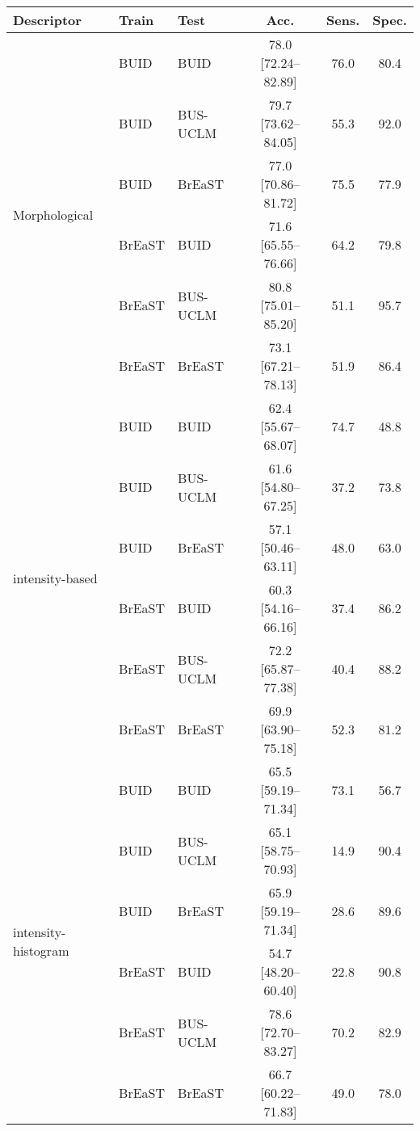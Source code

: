 \begin{tabular}{lllccc}\\ 
\toprule
Descriptor & Train &Test & Acc. & Sens. &Spec.\\ 
\midrule
\multirow{6}{*}{Morphological} & BUID & BUID & 78.0 [72.24--82.89] & 76.0 & 80.4\\ 
 & BUID & BUS-UCLM & 79.7 [73.62--84.05] & 55.3 & 92.0\\ 
 & BUID & BrEaST & 77.0 [70.86--81.72] & 75.5 & 77.9\\ 
 & BrEaST & BUID & 71.6 [65.55--76.66] & 64.2 & 79.8\\ 
 & BrEaST & BUS-UCLM & 80.8 [75.01--85.20] & 51.1 & 95.7\\ 
 & BrEaST & BrEaST & 73.1 [67.21--78.13] & 51.9 & 86.4\\ 
\midrule
\multirow{6}{*}{intensity-based} & BUID & BUID & 62.4 [55.67--68.07] & 74.7 & 48.8\\ 
 & BUID & BUS-UCLM & 61.6 [54.80--67.25] & 37.2 & 73.8\\ 
 & BUID & BrEaST & 57.1 [50.46--63.11] & 48.0 & 63.0\\ 
 & BrEaST & BUID & 60.3 [54.16--66.16] & 37.4 & 86.2\\ 
 & BrEaST & BUS-UCLM & 72.2 [65.87--77.38] & 40.4 & 88.2\\ 
 & BrEaST & BrEaST & 69.9 [63.90--75.18] & 52.3 & 81.2\\ 
\midrule
\multirow{6}{*}{intensity-histogram} & BUID & BUID & 65.5 [59.19--71.34] & 73.1 & 56.7\\ 
 & BUID & BUS-UCLM & 65.1 [58.75--70.93] & 14.9 & 90.4\\ 
 & BUID & BrEaST & 65.9 [59.19--71.34] & 28.6 & 89.6\\ 
 & BrEaST & BUID & 54.7 [48.20--60.40] & 22.8 & 90.8\\ 
 & BrEaST & BUS-UCLM & 78.6 [72.70--83.27] & 70.2 & 82.9\\ 
 & BrEaST & BrEaST & 66.7 [60.22--71.83] & 49.0 & 78.0\\ 
\bottomrule
\end{tabular}
